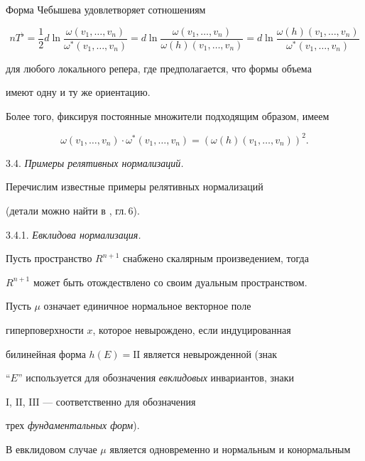 Форма Чебышева удовлетворяет сотношениям


$$


nT^{\flat} = \frac {1}{2} d \ln \frac {\omega


(v_1, \dotsc, v_n)} {\omega^* (v_1, \dotsc, v_n)} = d \ln


\frac {\omega (v_1, \dotsc, v_n)} {\omega(h) (v_1, \dotsc, v_n)} = d


\ln \frac {\omega(h) (v_1, \dotsc, v_n)} {\omega^* (v_1, \dotsc,v_n)}


$$


для любого локального репера, где предполагается, что формы объема


имеют одну и ту же ориентацию.


Более того, фиксируя постоянные множители подходящим образом, имеем


$$


\omega (v_1, \dotsc, v_n) \cdot \omega^* (v_1, \dotsc, v_n) =


(\omega(h) (v_1, \dotsc,v_n))^2.


$$





3.4. {\it Примеры релятивных нормализаций.}


Перечислим известные примеры релятивных нормализаций


(детали можно найти в  \cite{SIM-S-V}, гл.\,6).


\smallskip





3.4.1. {\it Евклидова нормализация.}


Пусть пространство $R^{n+1}$ снабжено скалярным произведением, тогда


$R^{n+1}$ может быть отождествлено со своим дуальным пространством.


Пусть $\mu$ означает единичное нормальное векторное поле


гиперповерхности $x$, которое невырождено, если индуцированная


билинейная форма $h(E)=\mathrm{II}$ является невырожденной (знак 


``$E$'' используется для обозначения {\it евклидовых} инвариантов, знаки


$\mathrm I$, $\mathrm{II}$, $\mathrm{III}$ --- соответственно для обозначения 


трех {\it фундаментальных форм}).


В евклидовом случае $\mu$ является одновременно и нормальным и конормальным


